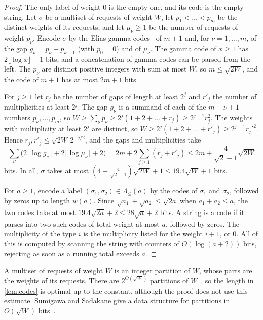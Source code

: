 \documentclass[11pt]{article}
\theoremstyle{definition}
\theoremstyle{definition}
\theoremstyle{remark}
\begin{document}
\begin{proof}
The only label of weight $0$ is the empty one, and its code is the empty string. Let $\sigma$ be a multiset of requests of weight $W$, let $p_1<\dots<p_m$ be the distinct weights of its requests, and let $\mu_\nu\ge1$ be the number of requests of weight $p_\nu$. Encode $\sigma$ by the Elias gamma codes~\cite{Eli75} of $m+1$ and, for $\nu=1,\dots,m$, of the gap $g_\nu=p_\nu-p_{\nu-1}$ (with $p_0=0$) and of $\mu_\nu$. The gamma code of $x\ge1$ has $2\lfloor\log x\rfloor+1$ bits, and a concatenation of gamma codes can be parsed from the left. The $p_\nu$ are distinct positive integers with sum at most $W$, so $m\le\sqrt{2W}$, and the code of $m+1$ has at most $2m+1$ bits.

For $j\ge1$ let $r_j$ be the number of gaps of length at least $2^j$ and $r'_j$ the number of multiplicities at least $2^j$. The gap $g_\nu$ is a summand of each of the $m-\nu+1$ numbers $p_\nu,\dots,p_m$, so $W\ge\sum_\nu p_\nu\ge2^j(1+2+\dots+r_j)\ge2^{j-1}r_j^2$. The weights with multiplicity at least $2^j$ are distinct, so $W\ge2^j(1+2+\dots+r'_j)\ge2^{j-1}r_j'^2$. Hence $r_j,r'_j\le\sqrt{2W}\,2^{-j/2}$, and the gaps and multiplicities take
\[
\sum_\nu\bigl(2\lfloor\log g_\nu\rfloor+2\lfloor\log\mu_\nu\rfloor+2\bigr)=2m+2\sum_{j\ge1}(r_j+r'_j)\le2m+\frac4{\sqrt2-1}\sqrt{2W}
\]
bits. In all, $\sigma$ takes at most $(4+\frac4{\sqrt2-1})\sqrt{2W}+1\le19.4\sqrt W+1$ bits.

For $a\ge1$, encode a label $(\sigma_1,\sigma_2)\in\Lambda_{\le}(a)$ by the codes of $\sigma_1$ and $\sigma_2$, followed by zeros up to length $w(a)$. Since $\sqrt{a_1}+\sqrt{a_2}\le\sqrt{2a}$ when $a_1+a_2\le a$, the two codes take at most $19.4\sqrt{2a}+2\le28\sqrt a+2$ bits. A string is a code if it parses into two such codes of total weight at most $a$, followed by zeros. The multiplicity of the type $i$ is the multiplicity listed for the weight $i+1$, or $0$. All of this is computed by scanning the string with counters of $O(\log(a+2))$ bits, rejecting as soon as a running total exceeds $a$.
\end{proof}

A multiset of requests of weight $W$ is an integer partition of $W$, whose parts are the weights of its requests. There are $2^{\Theta(\sqrt W)}$ partitions of $W$~\cite{HR18}, so the length in \cref{lem:codes} is optimal up to the constant, although the proof does not use this estimate. Sumigawa and Sadakane give a data structure for partitions in $O(\sqrt W)$ bits~\cite{SS18}.
\end{document}
